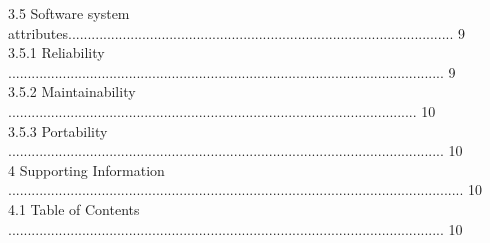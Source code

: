 \documentclass[10pt,draftclsnofoot,onecolumn]{IEEEtran}
\newcommand\tab[1][1cm]{\hspace*{#1}}
\begin{document}
\tab 3.5 Software system attributes................................................................................................... 9\\
  \vspace{5mm}
\tab \tab 3.5.1 Reliability ................................................................................................................ 9\\
                 \vspace{5mm}
\tab \tab 3.5.2 Maintainability ......................................................................................................... 10\\
                 \vspace{5mm}
\tab \tab 3.5.3 Portability ................................................................................................................ 10\\
                 \vspace{5mm}
4 Supporting Information ..................................................................................................................... 10\\
                 \vspace{5mm}
\tab 4.1 Table of Contents ................................................................................................................ 10\\
                 \vspace{5mm}
\end{document}

